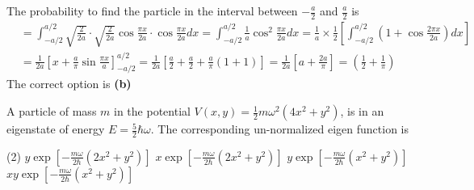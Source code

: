 \begin{enumerate}
\begin{tasks}
\end{tasks}
\begin{answer}
	The probability to find the particle in the interval between $-\frac{a}{2}$ and $\frac{a}{2}$ is
	$$
	\begin{aligned}
	&=\int_{-a / 2}^{a / 2} \sqrt{\frac{2}{2 a}} \cdot \sqrt{\frac{2}{2 a}} \cos \frac{\pi x}{2 a} \cdot \cos \frac{\pi x}{2 a} d x=\int_{-a / 2}^{a / 2} \frac{1}{a} \cos ^{2} \frac{\pi x}{2 a} d x=\frac{1}{a} \times \frac{1}{2}\left[\int_{-a / 2}^{a / 2}\left(1+\cos \frac{2 \pi x}{2 a}\right) d x\right] \\
	&=\frac{1}{2 a}\left[x+\frac{a}{\pi} \sin \frac{\pi x}{a}\right]_{-a / 2}^{a / 2}=\frac{1}{2 a}\left[\frac{a}{2}+\frac{a}{2}+\frac{a}{\pi}(1+1)\right]=\frac{1}{2 a}\left[a+\frac{2 a}{\pi}\right]=\left(\frac{1}{2}+\frac{1}{\pi}\right)
	\end{aligned}
	$$
	The correct option is \textbf{(b)}
\end{answer}
\begin{minipage}{\textwidth}
	\item A particle of mass $m$ in the potential $V(x, y)=\frac{1}{2} m \omega^{2}\left(4 x^{2}+y^{2}\right)$, is in an eigenstate of energy $E=\frac{5}{2} \hbar \omega$. The corresponding un-normalized eigen function is
\end{minipage}
\begin{tasks}(2)
	\task[\textbf{A.}] $y \exp \left[-\frac{m \omega}{2 \hbar}\left(2 x^{2}+y^{2}\right)\right]$
	\task[\textbf{B.}]$x \exp \left[-\frac{m \omega}{2 \hbar}\left(2 x^{2}+y^{2}\right)\right]$
	\task[\textbf{C.}]$y \exp \left[-\frac{m \omega}{2 \hbar}\left(x^{2}+y^{2}\right)\right]$
	\task[\textbf{D.}]$x y \exp \left[-\frac{m \omega}{2 \hbar}\left(x^{2}+y^{2}\right)\right]$
\end{tasks}
\end{enumerate}

